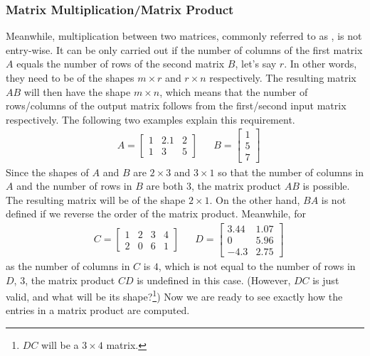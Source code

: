 \subsubsection{Matrix Multiplication/Matrix Product} Meanwhile, multiplication between two matrices, commonly referred to as , is not entry-wise. It can be only carried out if the number of columns of the first matrix $A$ equals the number of rows of the second matrix $B$, let's say $r$. In other words, they need to be of the shapes $m \times r$ and $r \times n$ respectively. The resulting matrix $AB$ will then have the shape $m \times n$, which means that the number of rows/columns of the output matrix follows from the first/second input matrix respectively. The following two examples explain this requirement.
\begin{align*}
& A = 
\begin{bmatrix}
1 & 2.1 & 2 \\
1 & 3 & 5
\end{bmatrix} &
& B = 
\begin{bmatrix}
1 \\
5 \\
7
\end{bmatrix}
\end{align*}
Since the shapes of $A$ and $B$ are $2 \times 3$ and $3 \times 1$ so that the number of columns in $A$ and the number of rows in $B$ are both $3$, the matrix product $AB$ is possible. The resulting matrix will be of the shape $2 \times 1$. On the other hand, $BA$ is not defined if we reverse the order of the matrix product. Meanwhile, for
\begin{align*}
& C = 
\begin{bmatrix}
1 & 2 & 3 & 4 \\
2 & 0 & 6 & 1
\end{bmatrix} &
& D = 
\begin{bmatrix}
3.44 & 1.07\\
0 & 5.96\\
-4.3 & 2.75
\end{bmatrix}
\end{align*}
as the number of columns in $C$ is $4$, which is not equal to the number of rows in $D$, $3$, the matrix product $CD$ is undefined in this case. (However, $DC$ is just valid, and what will be its shape?\footnote{$DC$ will be a $3 \times 4$ matrix.}) Now we are ready to see exactly how the entries in a matrix product are computed.

